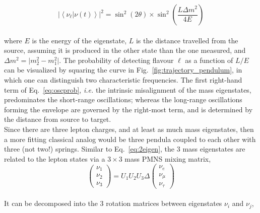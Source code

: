 \begin{equation}
\label{eq:oscprob}
\left\vert \left\langle \nu_\ell \vert \nu (t) \right\rangle \right\vert^2 =  \sin^2 \left( 2 \theta \right) \times \sin^2 \left( \frac{L \Delta m^2}{4 E} \right)
\end{equation} \\ where $E$ is the energy of the eigenstate, $L$ is the distance travelled from the source, assuming it is produced in the other state than the one measured, and $\Delta m^2 = \vert m^2_2 - m^2_1 \vert$. The probability of detecting flavour $\ell$ as a function of $L/E$ can be visualized by squaring the curve in Fig.~\ref{fig:trajectory_pendulum}, in which one can distinguish two characteristic frequencies. The first right-hand term of Eq.~\ref{eq:oscprob}, \textit{i.e.} the intrinsic misalignment of the mass eigenstates, predominates the short-range oscillations; whereas the long-range oscillations forming the envelope are governed by the right-most term, and is determined by the distance from source to target. \\



Since there are three lepton charges, and at least as much mass eigenstates, then a more fitting classical analog would be three pendula coupled to each other with three (not two!) springs. Similar to Eq.~\ref{eq:2eigen}, the $3$ mass eigenstates are related to the lepton states via a $3 \times 3$ mass PMNS mixing matrix, \\


\begin{equation}
\left( 
\begin{array}{c}
\nu_1 \\
\nu_2 \\
\nu_3
\end{array}
\right) = 
U_1 U_2 U_3 \Delta
\left( 
\begin{array}{c}
\nu_e \\
\nu_\mu \\
\nu_\tau
\end{array}
\right)
\end{equation} \\ It can be decomposed into the $3$ rotation matrices between eigenstates $\nu_i$ and $\nu_j$, 

